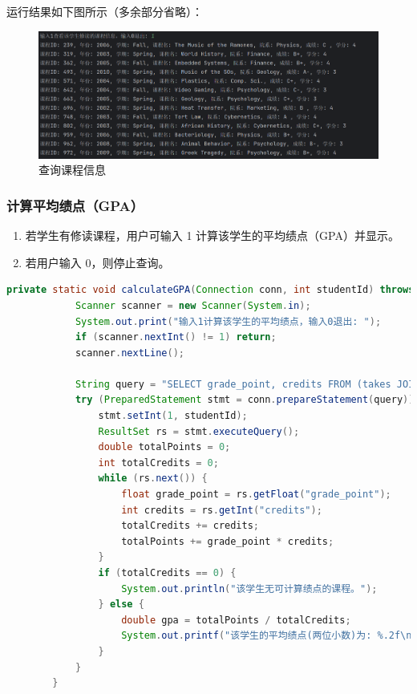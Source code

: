 \documentclass{article}
\begin{document}
	运行结果如下图所示（多余部分省略）：
	
	\begin{figure}[H]
		\centering
		\includegraphics[width=13cm]{./images/22.查询课程.png}
		\caption{查询课程信息}
	\end{figure}
	
	\subsubsection{计算平均绩点（GPA）}
	\begin{enumerate}
		\item 若学生有修读课程，用户可输入 1 计算该学生的平均绩点（GPA）并显示。
		\item 若用户输入 0，则停止查询。
	\end{enumerate}
	
	
	\begin{lstlisting}[language=java, title=计算平均绩点(GPA), tabsize=4]
		private static void calculateGPA(Connection conn, int studentId) throws SQLException {
			Scanner scanner = new Scanner(System.in);
			System.out.print("输入1计算该学生的平均绩点，输入0退出: ");
			if (scanner.nextInt() != 1) return;
			scanner.nextLine();
			
			String query = "SELECT grade_point, credits FROM (takes JOIN course ON takes.course_id = course.course_id) JOIN gpa ON gpa.grade = TRIM(takes.grade) WHERE ID = ?";
			try (PreparedStatement stmt = conn.prepareStatement(query)) {
				stmt.setInt(1, studentId);
				ResultSet rs = stmt.executeQuery();
				double totalPoints = 0;
				int totalCredits = 0;
				while (rs.next()) {
					float grade_point = rs.getFloat("grade_point");
					int credits = rs.getInt("credits");
					totalCredits += credits;
					totalPoints += grade_point * credits;
				}
				if (totalCredits == 0) {
					System.out.println("该学生无可计算绩点的课程。");
				} else {
					double gpa = totalPoints / totalCredits;
					System.out.printf("该学生的平均绩点(两位小数)为: %.2f\n", gpa);
				}
			}
		}
	\end{lstlisting}
	
\end{document}
